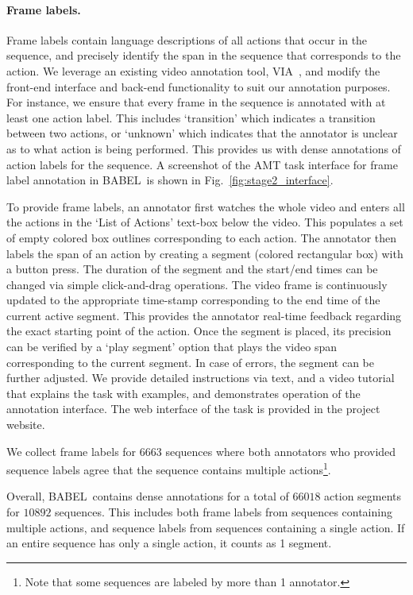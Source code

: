 \documentclass[final]{cvpr}
\def\babel{BABEL}
\begin{document}
\noindent
\paragraph{Frame labels.}
\label{sec:stage_2_interface}
Frame labels contain language descriptions of all actions that occur in the sequence, and precisely identify the span in the sequence that corresponds to the action. 
We leverage an existing video annotation tool, VIA~\cite{dutta2019vgg}, and modify the front-end interface and back-end functionality to suit our annotation purposes. 
For instance, we ensure that every frame in the sequence is annotated with at least one action label. This includes `transition' which indicates a transition between two actions, or `unknown' which indicates that the annotator is unclear as to what action is being performed. 
This provides us with dense annotations of action labels for the sequence. 
A screenshot of the AMT task interface for frame label annotation in \babel~is shown in Fig.~\ref{fig:stage2_interface}. 

To provide frame labels, an annotator first watches the whole video and enters all the actions in the `List of Actions' text-box below the video. 
This populates a set of empty colored box outlines corresponding to each action. 
The annotator then labels the span of an action by creating a segment (colored rectangular box) with a button press. 
The duration of the segment and the start/end times can be changed via simple click-and-drag operations. 
The video frame is continuously updated to the appropriate time-stamp corresponding to the end time of the current active segment. This provides the annotator real-time feedback regarding the exact starting point of the action. 
Once the segment is placed, its precision can be verified by a `play segment' option that plays the video span corresponding to the current segment. In case of errors, the segment can be further adjusted. 
We provide detailed instructions via text, and a video tutorial that explains the task with examples, and demonstrates operation of the annotation interface. 
The web interface of the task is provided in the project website. 

We collect frame labels for $6663$ sequences where both annotators who provided sequence labels agree that the sequence contains multiple actions\footnote{Note that some sequences are labeled by more than 1 annotator.}.

Overall, \babel~contains dense annotations for a total of $66018$ action segments for $10892$ sequences. This includes both frame labels from sequences containing multiple actions, and sequence labels from sequences containing a single action. If an entire sequence has only a single action, it counts as 1 segment. 
\end{document}
